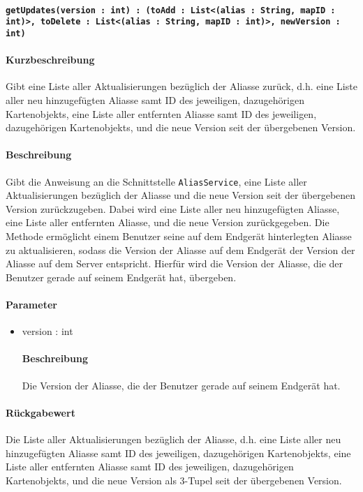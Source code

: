 \paragraph{\texttt{getUpdates(version : int) : (toAdd : List<(alias : String, mapID : int)>, toDelete : List<(alias : String, mapID : int)>, newVersion : int)}}%
\paragraph*{Kurzbeschreibung}
Gibt eine Liste aller Aktualisierungen bezüglich der Aliasse zurück, d.h. eine Liste aller neu hinzugefügten Aliasse samt ID des jeweiligen, dazugehörigen Kartenobjekts, eine Liste aller entfernten Aliasse samt ID des jeweiligen, dazugehörigen Kartenobjekts, und die neue Version seit der übergebenen Version.
\paragraph*{Beschreibung}
Gibt die Anweisung an die Schnittstelle \texttt{AliasService}, eine Liste aller Aktualisierungen bezüglich der Aliasse und die neue Version seit der übergebenen Version zurückzugeben. 
Dabei wird eine Liste aller neu hinzugefügten Aliasse, eine Liste aller entfernten Aliasse, und die neue Version zurückgegeben.
Die Methode ermöglicht einem Benutzer seine auf dem Endgerät hinterlegten Aliasse zu aktualisieren, sodass die Version der Aliasse auf dem Endgerät der Version der Aliasse auf dem Server entspricht.
Hierfür wird die Version der Aliasse, die der Benutzer gerade auf seinem Endgerät hat, übergeben.
\paragraph*{Parameter}
\begin{itemize}
    \item version : int
    		\paragraph*{Beschreibung}
    		Die Version der Aliasse, die der Benutzer gerade auf seinem Endgerät hat.
\end{itemize}
\paragraph*{Rückgabewert}
Die Liste aller Aktualisierungen bezüglich der Aliasse, d.h. eine Liste aller neu hinzugefügten Aliasse samt ID des jeweiligen, dazugehörigen Kartenobjekts, eine Liste aller entfernten Aliasse samt ID des jeweiligen, dazugehörigen Kartenobjekts, und die neue Version als 3-Tupel seit der übergebenen Version.
